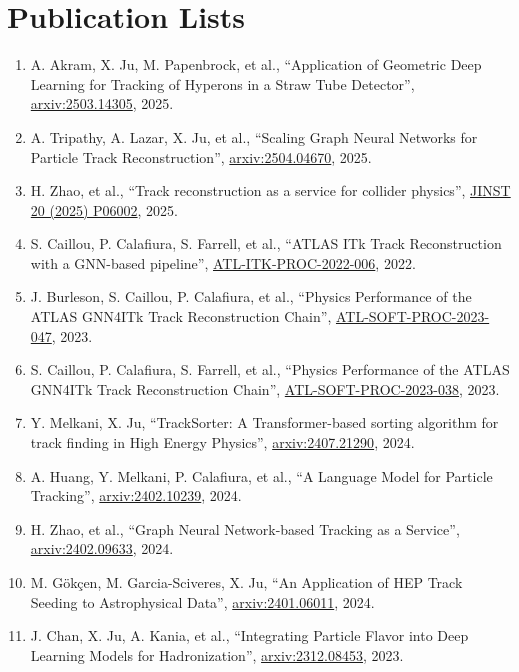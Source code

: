 \section*{Publication Lists}
\begin{enumerate}
\item A. Akram, X. Ju, M. Papenbrock, et al., ``Application of Geometric Deep Learning for Tracking of Hyperons in a Straw Tube Detector'', \href{https://arxiv.org/abs/2503.14305}{arxiv:2503.14305}, 2025.
\item A. Tripathy, A. Lazar, X. Ju, et al., ``Scaling Graph Neural Networks for Particle Track Reconstruction'', \href{https://arxiv.org/abs/2504.04670}{arxiv:2504.04670}, 2025.
\item H. Zhao, et al., ``Track reconstruction as a service for collider physics'', \href{https://doi.org/10.1088/1748-0221/20/06/P06002}{JINST 20 (2025) P06002}, 2025.
\item S. Caillou, P. Calafiura, S. Farrell, et al., ``ATLAS ITk Track Reconstruction with a GNN-based pipeline'', \href{https://cds.cern.ch/record/2815578}{ATL-ITK-PROC-2022-006}, 2022.
\item J. Burleson, S. Caillou, P. Calafiura, et al., ``Physics Performance of the ATLAS GNN4ITk Track Reconstruction Chain'', \href{https://cds.cern.ch/record/2882507}{ATL-SOFT-PROC-2023-047}, 2023.
\item S. Caillou, P. Calafiura, S. Farrell, et al., ``Physics Performance of the ATLAS GNN4ITk Track Reconstruction Chain'', \href{https://cds.cern.ch/record/2871986}{ATL-SOFT-PROC-2023-038}, 2023.
\item Y. Melkani, X. Ju, ``TrackSorter: A Transformer-based sorting algorithm for track finding in High Energy Physics'', \href{https://arxiv.org/abs/2407.21290}{arxiv:2407.21290}, 2024.
\item A. Huang, Y. Melkani, P. Calafiura, et al., ``A Language Model for Particle Tracking'', \href{https://arxiv.org/abs/2402.10239}{arxiv:2402.10239}, 2024.
\item H. Zhao, et al., ``Graph Neural Network-based Tracking as a Service'', \href{https://arxiv.org/abs/2402.09633}{arxiv:2402.09633}, 2024.
\item M. G\"ok\c{c}en, M. Garcia-Sciveres, X. Ju, ``An Application of HEP Track Seeding to Astrophysical Data'', \href{https://arxiv.org/abs/2401.06011}{arxiv:2401.06011}, 2024.
\item J. Chan, X. Ju, A. Kania, et al., ``Integrating Particle Flavor into Deep Learning Models for Hadronization'', \href{https://arxiv.org/abs/2312.08453}{arxiv:2312.08453}, 2023.

\end{enumerate}
